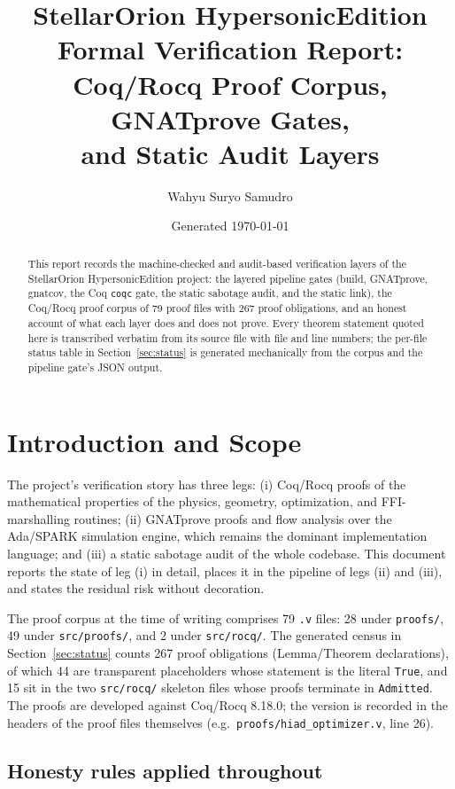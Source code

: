 \documentclass[11pt]{article}
\title{\textbf{StellarOrion HypersonicEdition}\\[2pt]
\large Formal Verification Report: Coq/Rocq Proof Corpus, GNATprove Gates,\\
and Static Audit Layers}
\author{Wahyu Suryo Samudro}
\date{Generated \today}
\theoremstyle{definition}
\begin{document}
\maketitle

\begin{abstract}
\noindent This report records the machine-checked and audit-based verification
layers of the StellarOrion HypersonicEdition project: the layered pipeline
gates (build, GNATprove, gnatcov, the Coq \texttt{coqc} gate, the static
sabotage audit, and the static link), the Coq/Rocq proof corpus of 79 proof
files with 267 proof obligations, and an honest account of what each layer
does and does not prove. Every theorem statement quoted here is transcribed
verbatim from its source file with file and line numbers; the per-file
status table in Section~\ref{sec:status} is generated mechanically from the
corpus and the pipeline gate's JSON output.
\end{abstract}

\tableofcontents

\section{Introduction and Scope}\label{sec:intro}

The project's verification story has three legs: (i) Coq/Rocq proofs of the
mathematical properties of the physics, geometry, optimization, and
FFI-marshalling routines; (ii) GNATprove proofs and flow analysis over the
Ada/SPARK simulation engine, which remains the dominant implementation
language; and (iii) a static sabotage audit of the whole codebase. This
document reports the state of leg (i) in detail, places it in the pipeline
of legs (ii) and (iii), and states the residual risk without decoration.

The proof corpus at the time of writing comprises 79 \texttt{.v} files:
28 under \texttt{proofs/}, 49 under \texttt{src/proofs/}, and 2 under
\texttt{src/rocq/}. The generated census in Section~\ref{sec:status}
counts 267 proof obligations (Lemma/Theorem declarations), of which 44 are
transparent placeholders whose statement is the literal \texttt{True}, and
15 sit in the two \texttt{src/rocq/} skeleton files whose proofs terminate
in \texttt{Admitted}. The proofs are developed against Coq/Rocq 8.18.0;
the version is recorded in the headers of the proof files themselves
(e.g.\ \texttt{proofs/hiad\_optimizer.v}, line 26).

\subsection*{Honesty rules applied throughout}
\end{document}
